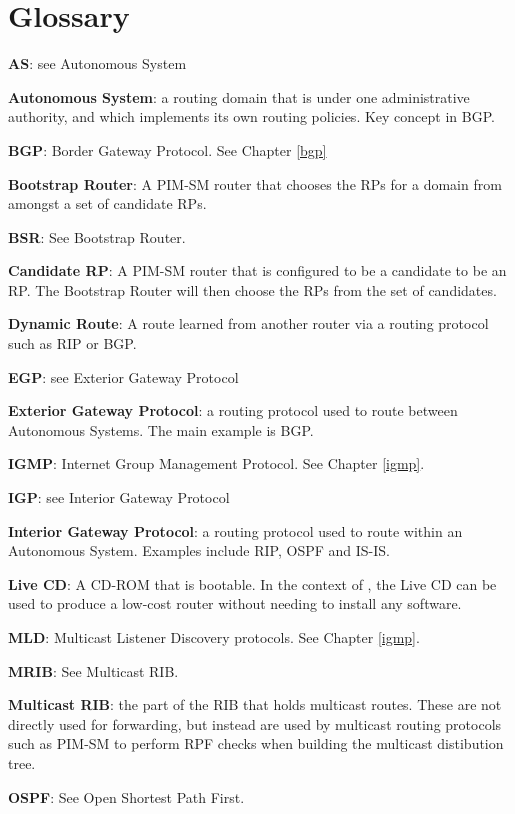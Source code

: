 \chapter*{Glossary}
\begin{description}
\item{\bf AS}: see Autonomous System
\item{\bf Autonomous System}: a routing domain that is under one
  administrative authority, and which implements its own routing
  policies.  Key concept in BGP.
\item{\bf BGP}: Border Gateway Protocol.  See Chapter \ref{bgp}
\item{\bf Bootstrap Router}: A PIM-SM router that chooses the RPs for
a domain from amongst a set of candidate RPs.
\item{\bf BSR}: See Bootstrap Router.
\item{\bf Candidate RP}: A PIM-SM router that is configured to be a
  candidate to be an RP.  The Bootstrap Router will then choose the
  RPs from the set of candidates.
\item{\bf Dynamic Route}: A route learned from another router via a
  routing protocol such as RIP or BGP.
\item{\bf EGP}: see Exterior Gateway Protocol
\item{\bf Exterior Gateway Protocol}: a routing protocol used to route
  between Autonomous Systems.  The main example is BGP.
\item{\bf IGMP}: Internet Group Management Protocol.  See Chapter \ref{igmp}.
\item{\bf IGP}: see Interior Gateway Protocol
\item{\bf Interior Gateway Protocol}: a routing protocol used to route
  within an Autonomous System.  Examples include RIP, OSPF and IS-IS.
\item{\bf Live CD}: A CD-ROM that is bootable.  In the context of
  \xorp, the Live CD can be used to produce a low-cost router without
  needing to install any software.
\item{\bf MLD}: Multicast Listener Discovery protocols.  See Chapter
  \ref{igmp}.
\item{\bf MRIB}: See Multicast RIB.
\item{\bf Multicast RIB}: the part of the RIB that holds multicast routes.
  These are not directly used for forwarding, but instead are used by
  multicast routing protocols such as PIM-SM to perform RPF checks
  when building the multicast distibution tree.
\item{\bf OSPF}: See Open Shortest Path First.

\end{description}
